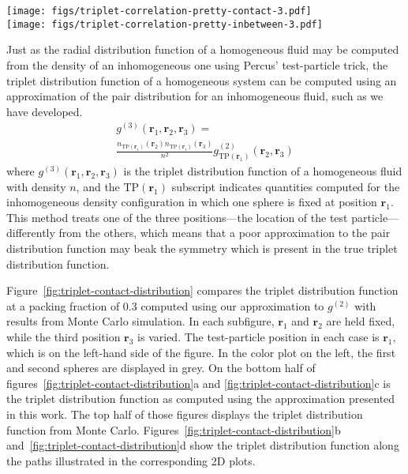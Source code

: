 \documentclass[letterpaper,twocolumn,amsmath,amssymb,pre,aps,10pt]{revtex4-1}
\newcommand{\red}[1]{{\bf \color{red} #1}}
\newcommand{\rr}{\textbf{r}}
\newcommand{\fixme}[1]{\red{[#1]}}
\begin{document}
\begin{figure*}
  \texttt{[image: figs/triplet-correlation-pretty-contact-3.pdf]}\\
  \texttt{[image: figs/triplet-correlation-pretty-inbetween-3.pdf]}
  \caption{\fixme{Remove one of, or make a note of, the two curves for
      this work}\fixme{Fix MC issue here (volume wrong?)} The triplet
    distribution function $g^{(3)}(\rr_1,\rr_2,\rr_3)$ at packing
    fraction 0.3, plotted when $\rr_1$ and $\rr_2$ are in contact.
    The color plot on the left shows the triplet distribution
    function, with white corresponding to the contact value of the
    \emph{pair} distribution function.  The plot on the right shows
    the value of $g^{(3)}$ along the path shown as a dotted line on
    the plot to the left.}\label{fig:triplet-contact-distribution}
\end{figure*}

Just as the radial distribution function of a homogeneous fluid may be
computed from the density of an inhomogeneous one using Percus'
test-particle trick, the triplet distribution function of a
homogeneous system can be computed using an approximation of the pair
distribution for an inhomogeneous fluid, such as we have developed.
\begin{multline}
    g^{(3)}(\rr_1,\rr_2,\rr_3) =\\
    \frac{n_{\textrm{TP}(\rr_1)}(\rr_2)
      n_{\textrm{TP}(\rr_1)}(\rr_3)}{n^2}
    g^{(2)}_{\textrm{TP}(\rr_1)}(\rr_2,\rr_3)
\end{multline}
where $g^{(3)}(\rr_1,\rr_2,\rr_3)$ is the triplet distribution
function of a homogeneous fluid with density $n$, and the
$\textrm{TP}(\rr_1)$ subscript indicates quantities computed for the
inhomogeneous density configuration in which one sphere is fixed at
position $\rr_1$.  This method treats one of the three positions---the
location of the test particle---differently from the others, which
means that a poor approximation to the pair distribution function may
beak the symmetry which is present in the true triplet distribution
function.

Figure~\ref{fig:triplet-contact-distribution} compares the triplet
distribution function at a packing fraction of 0.3 computed using our
approximation to $g^{(2)}$ with results from Monte Carlo simulation.
In each subfigure, $\rr_1$ and $\rr_2$ are held fixed, while the third
position $\rr_3$ is varied.  The test-particle position in each case
is $\rr_1$, which is on the left-hand side of the figure.  In the
color plot on the left, the first and second spheres are displayed in
grey.  On the bottom half of
figures~\ref{fig:triplet-contact-distribution}a and
\ref{fig:triplet-contact-distribution}c is the triplet distribution
function as computed using the approximation presented in this work.
The top half of those figures displays the triplet distribution
function from Monte Carlo.
Figures~\ref{fig:triplet-contact-distribution}b
and~\ref{fig:triplet-contact-distribution}d show the triplet
distribution function along the paths illustrated in the corresponding
2D plots.
\end{document}
